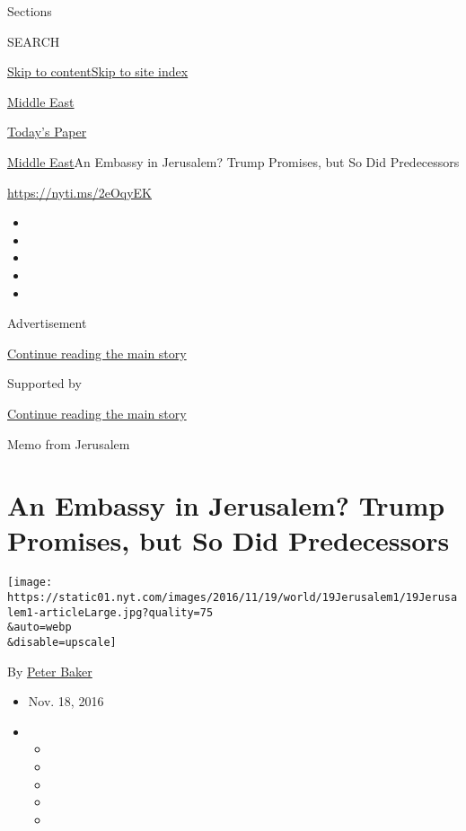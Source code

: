 Sections

SEARCH

\protect\hyperlink{site-content}{Skip to
content}\protect\hyperlink{site-index}{Skip to site index}

\href{https://www.nytimes.com/section/world/middleeast}{Middle East}

\href{https://myaccount.nytimes.com/auth/login?response_type=cookie\&client_id=vi}{}

\href{https://www.nytimes.com/section/todayspaper}{Today's Paper}

\href{/section/world/middleeast}{Middle East}\textbar{}An Embassy in
Jerusalem? Trump Promises, but So Did Predecessors

\url{https://nyti.ms/2eOqyEK}

\begin{itemize}
\item
\item
\item
\item
\item
\end{itemize}

Advertisement

\protect\hyperlink{after-top}{Continue reading the main story}

Supported by

\protect\hyperlink{after-sponsor}{Continue reading the main story}

Memo from Jerusalem

\hypertarget{an-embassy-in-jerusalem-trump-promises-but-so-did-predecessors}{%
\section{An Embassy in Jerusalem? Trump Promises, but So Did
Predecessors}\label{an-embassy-in-jerusalem-trump-promises-but-so-did-predecessors}}

\texttt{[image: https://static01.nyt.com/images/2016/11/19/world/19Jerusalem1/19Jerusalem1-articleLarge.jpg?quality=75\\\&auto=webp\\\&disable=upscale]}

By \href{http://www.nytimes.com/by/peter-baker}{Peter Baker}

\begin{itemize}
\item
  Nov. 18, 2016
\item
  \begin{itemize}
  \item
  \item
  \item
  \item
  \item
  \end{itemize}
\end{itemize}

